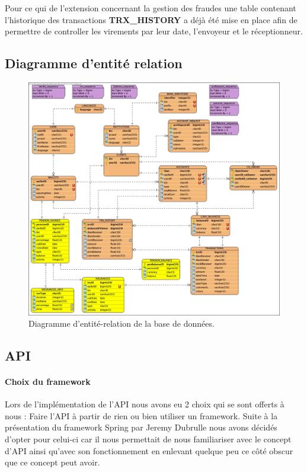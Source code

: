 \documentclass[../rapport.tex]{subfiles}
\begin{document}
	\medskip

	Pour ce qui de l'extension concernant la gestion des fraudes une table contenant l'historique
	des transactions \textbf{TRX\_HISTORY} a déjà été mise en place afin de permettre de controller
	les virements par leur date, l'envoyeur et le réceptionneur. 
	
	
	\newpage
	\subsection{Diagramme d'entité relation}
	
		\begin{figure}[h]
			\centering\includegraphics[scale=0.3]{ressources/finalDb.jpg}
			\caption{Diagramme d'entité-relation de la base de données.}
		\end{figure}

\newpage

\subsection{API}

\paragraph{Choix du framework }
Lors de l'implémentation de l'API nous avons eu 2 choix qui se sont offerts à nous : Faire l'API à partir de rien ou bien utiliser un framework.
Suite à la présentation du framework Spring par Jeremy Dubrulle nous avons décidés d'opter pour celui-ci car il nous permettait de nous familiariser avec
le concept d'API ainsi qu'avec son fonctionnement en enlevant quelque peu ce côté obscur que ce concept peut avoir.
\end{document}
